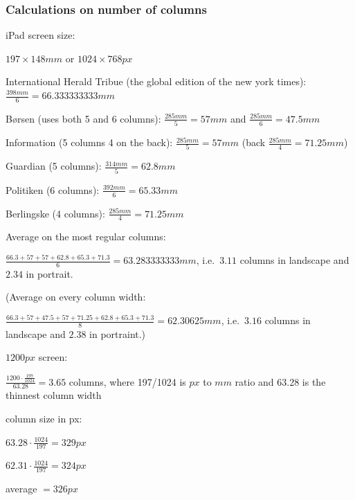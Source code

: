 \subsubsection{Calculations on number of columns}
\label{sec:column_calc}
iPad screen size:

$197 \times 148mm$ or $1024 \times 768px$

International Herald Tribue (the global edition of the new york times): $\frac{398mm}{6} = 66.333333333mm$

Børsen (uses both 5 and 6 columns): $\frac{285mm}{5} = 57mm$ and $\frac{285mm}{6} = 47.5mm$

Information (5 columns 4 on the back): $\frac{285mm}{5} = 57mm$ (back $\frac{285mm}{4} = 71.25mm$)

Guardian (5 columns): $\frac{314mm}{5} = 62.8mm$

Politiken (6 columns): $\frac{392mm}{6} = 65.33mm$

Berlingske (4 columns): $\frac{285mm}{4} = 71.25mm$

Average on the most regular columns:

$\frac{66.3+57+57+62.8+65.3+71.3}{6} = 63.283333333mm$, i.e.\ $3.11$ columns in landscape and $2.34$ in portrait.

(Average on every column width:

$\frac{66.3+57+47.5+57+71.25+62.8+65.3+71.3}{8} = 62.30625mm$, i.e.\ $3.16$ columns in landscape and $2.38$ in portraint.)

$1200px$ screen:

$\frac{1200 \cdot \frac{197}{1024}}{63.28} = 3.65$ columns, where 197/1024 is $px$ to $mm$ ratio and 63.28 is the thinnest column width

column size in px:

$63.28 \cdot \frac{1024}{197} = 329px$

$62.31 \cdot \frac{1024}{197} = 324px$

average $= 326px$

